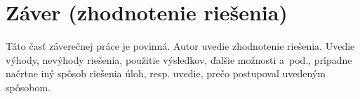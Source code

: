 \section{Z\'aver (zhodnotenie rie\v{s}enia)}

Táto časť\/ záverečnej práce je povinná. Autor uvedie zhodnotenie
riešenia. Uvedie výhody, nevýhody riešenia,  použitie výsledkov, ďalšie
možnosti a~pod., prípadne načrtne iný spôsob riešenia úloh, resp.
uvedie, prečo postupoval uvedeným spôsobom.
